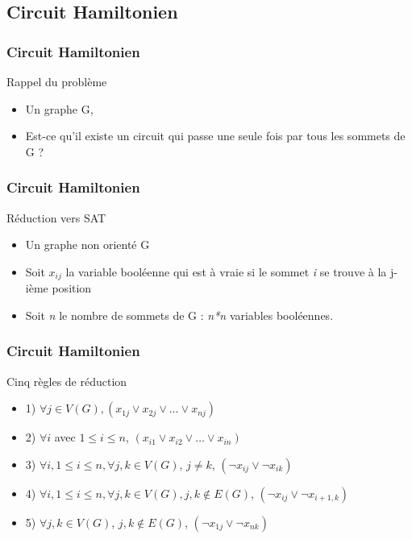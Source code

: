 


\subsection{Circuit Hamiltonien}

\begin{frame}
\frametitle{Circuit Hamiltonien}
\begin{block}{Rappel du probl\`eme}
  \begin{itemize}
  \item Un graphe G,
  \item Est-ce qu'il existe un circuit qui passe une seule fois par
    tous les sommets de G ?
  \end{itemize}
\end{block}
\end{frame}

\begin{frame}
\frametitle{Circuit Hamiltonien}
\begin{block}{R\'eduction vers SAT}
  \begin{itemize}
  \item Un graphe non orient\'e G
  \item Soit \textit{$x_{ij}$} la variable bool\'eenne qui est \`a
    vraie si le sommet \textit{i} se trouve \`a la j-i\`eme position
  \item Soit \textit{n} le nombre de sommets de G : \textit{n*n}
    variables bool\'eennes.
  \end{itemize}
\end{block}
\end{frame}

\begin{frame}
\frametitle{Circuit Hamiltonien}
\begin{block}{Cinq r\`egles de r\'eduction}
  \begin{itemize}
  \item 1) $\forall j \in V(G), (x_{1j} \vee x_{2j} \vee \ldots \vee
    x_{nj})$
  \item 2) $\forall i$ avec $1 \leq i \leq n$, $(x_{i1} \vee x_{i2} \vee
    \ldots \vee x_{in})$
  \item 3) $\forall i, 1 \leq i \leq n, \forall {j, k} \in V(G)$, $j \ne
    k$, $(\neg x_{ij} \vee \neg x_{ik})$
  \item 4) $\forall i, 1 \leq i \leq n, \forall {j, k} \in V(G), {j,k}
    \notin E(G)$, $(\neg x_{ij} \vee \neg x_{i+1,k})$
  \item 5) $\forall j,k \in V(G)$, ${j,k} \notin E(G)$, $(\neg x_{1j}
    \vee \neg x_{nk})$
  \end{itemize}
\end{block}
\end{frame}

